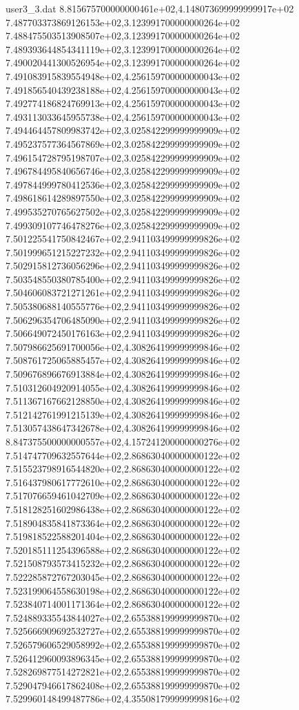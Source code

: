 \begin{filecontents}{user3_3.dat}
8.815675700000000461e+02,4.148073699999999917e+02
7.487703373869126153e+02,3.123991700000000264e+02
7.488475503513908507e+02,3.123991700000000264e+02
7.489393644854341119e+02,3.123991700000000264e+02
7.490020441300526954e+02,3.123991700000000264e+02
7.491083915839554948e+02,4.256159700000000043e+02
7.491856540439238188e+02,4.256159700000000043e+02
7.492774186824769913e+02,4.256159700000000043e+02
7.493113033645955738e+02,4.256159700000000043e+02
7.494464457809983742e+02,3.025842299999999909e+02
7.495237577364567869e+02,3.025842299999999909e+02
7.496154728795198707e+02,3.025842299999999909e+02
7.496784495840656746e+02,3.025842299999999909e+02
7.497844999780412536e+02,3.025842299999999909e+02
7.498618614289897550e+02,3.025842299999999909e+02
7.499535270765627502e+02,3.025842299999999909e+02
7.499309107746478276e+02,3.025842299999999909e+02
7.501225541750842467e+02,2.941103499999999826e+02
7.501999651215227232e+02,2.941103499999999826e+02
7.502915812736056296e+02,2.941103499999999826e+02
7.503548550380785400e+02,2.941103499999999826e+02
7.504606083721271261e+02,2.941103499999999826e+02
7.505380688140555776e+02,2.941103499999999826e+02
7.506296354706485090e+02,2.941103499999999826e+02
7.506649072450176163e+02,2.941103499999999826e+02
7.507986625691700056e+02,4.308264199999999846e+02
7.508761725065885457e+02,4.308264199999999846e+02
7.509676896676913884e+02,4.308264199999999846e+02
7.510312604920914055e+02,4.308264199999999846e+02
7.511367167662128850e+02,4.308264199999999846e+02
7.512142761991215139e+02,4.308264199999999846e+02
7.513057438647342678e+02,4.308264199999999846e+02
8.847375500000000557e+02,4.157241200000000276e+02
7.514747709632557644e+02,2.868630400000000122e+02
7.515523798916544820e+02,2.868630400000000122e+02
7.516437980617772610e+02,2.868630400000000122e+02
7.517076659461042709e+02,2.868630400000000122e+02
7.518128251602986438e+02,2.868630400000000122e+02
7.518904835841873364e+02,2.868630400000000122e+02
7.519818522588201404e+02,2.868630400000000122e+02
7.520185111254396588e+02,2.868630400000000122e+02
7.521508793573415232e+02,2.868630400000000122e+02
7.522285872767203045e+02,2.868630400000000122e+02
7.523199064558630198e+02,2.868630400000000122e+02
7.523840714001171364e+02,2.868630400000000122e+02
7.524889335543844027e+02,2.655388199999999870e+02
7.525666909692532727e+02,2.655388199999999870e+02
7.526579606529058992e+02,2.655388199999999870e+02
7.526412960093896345e+02,2.655388199999999870e+02
7.528269877514272821e+02,2.655388199999999870e+02
7.529047946617862408e+02,2.655388199999999870e+02
7.529960148499487786e+02,4.355081799999999816e+02

\end{filecontents}
